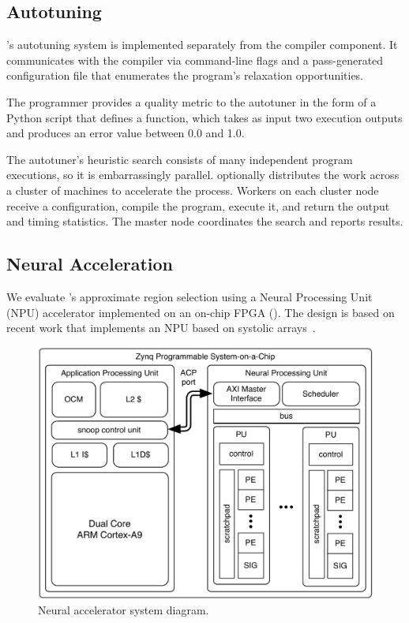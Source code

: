 \subsection{Autotuning}

\sysname's autotuning system is implemented separately
from the compiler component. It communicates with the compiler via
command-line flags and a pass-generated configuration file that enumerates the
program's relaxation opportunities.

The programmer provides a quality metric to the autotuner in the form of a Python script that
defines a  function, which
takes as input two execution outputs and
produces an error value between 0.0 and 1.0.

The autotuner's heuristic search consists of many independent program
executions, so it is embarrassingly parallel.
\sysname
optionally distributes the work across a cluster of machines to accelerate the
process.  Workers on each cluster node receive a configuration, compile the
program, execute it, and return the output and timing statistics. The master
node coordinates the search and reports results.

\subsection{Neural Acceleration}
\label{accept:sec:accelerator}

We evaluate \sysname's approximate region selection using a Neural Processing
Unit (NPU) accelerator implemented on an on-chip FPGA ().  The
design is based on recent work that implements an NPU based on systolic
arrays~\cite{npu, snnap}.

\iffalse
\begin{figure}
    \centering
    \includegraphics[width=0.8\linewidth]{figs/npu.pdf}
    \vspace{-1.5ex}
    \caption{Neural accelerator system diagram.}
    \label{accept:fig:snnap}
\end{figure}

